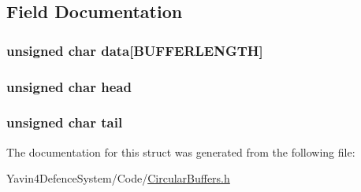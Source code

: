 \subsection{Field Documentation}
\hypertarget{structcircularBuffer_ad7b57ba90694482456be1fbab7de4aec}{
\subsubsection[{data}]{\setlength{\rightskip}{0pt plus 5cm}unsigned char data\mbox{[}{\bf B\+U\+F\+F\+E\+R\+L\+E\+N\+G\+T\+H}\mbox{]}}}\label{structcircularBuffer_ad7b57ba90694482456be1fbab7de4aec}
\hypertarget{structcircularBuffer_a47f7e6109597e5c1c227993c0ce5f560}{
\subsubsection[{head}]{\setlength{\rightskip}{0pt plus 5cm}unsigned char head}}\label{structcircularBuffer_a47f7e6109597e5c1c227993c0ce5f560}
\hypertarget{structcircularBuffer_af18a1d7542e277284c4794593b049258}{
\subsubsection[{tail}]{\setlength{\rightskip}{0pt plus 5cm}unsigned char tail}}\label{structcircularBuffer_af18a1d7542e277284c4794593b049258}


The documentation for this struct was generated from the following file\+:\begin{DoxyCompactItemize}
\item 
Yavin4\+Defence\+System/\+Code/\hyperlink{CircularBuffers_8h}{Circular\+Buffers.\+h}\end{DoxyCompactItemize}
